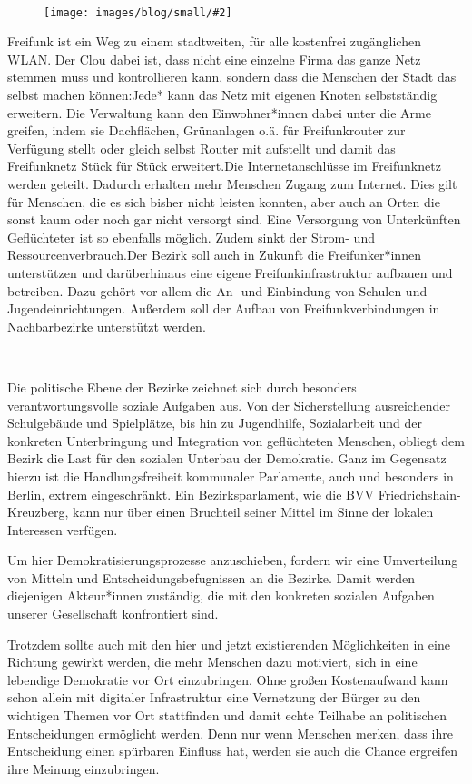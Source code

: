 \documentclass[a4paper,10pt]{article}
\newcommand{\mysection}[1]{{\vspace{1cm}\noindent\color{gray}{\ttfamily\LARGE\raggedright #1}\\\medskip}}
\newcommand{\abschnitt}[2]{%
\mysection{\raggedright #1}%
\begin{figure}[t]%
\vspace*{-2.7cm}%
\hspace*{-2.1cm}%
\texttt{[image: images/blog/small/\#2]} %
\end{figure}%
}
\begin{document}
\clearpage
\abschnitt{Freifunk}{routerallerlaender.jpg}

\enlargethispage{-1em}
Freifunk ist ein Weg zu einem stadtweiten, für alle kostenfrei
zugänglichen WLAN. Der Clou dabei ist, dass nicht eine einzelne Firma
das ganze Netz stemmen muss und kontrollieren kann, sondern dass die
Menschen der Stadt das selbst machen können:Jede* kann das Netz mit
eigenen Knoten selbstständig erweitern. Die Verwaltung kann den
Einwohner*innen dabei unter die Arme greifen, indem sie
Dachflächen, Grünanlagen o.ä. für Freifunkrouter zur Verfügung stellt
oder gleich selbst Router mit aufstellt und damit das Freifunknetz Stück
für Stück erweitert.Die Internetanschlüsse im Freifunknetz werden
geteilt. Dadurch erhalten mehr Menschen Zugang zum Internet. Dies gilt
für Menschen, die es sich bisher nicht leisten konnten, aber auch an
Orten die sonst kaum oder noch gar nicht versorgt sind. Eine Versorgung
von Unterkünften Geflüchteter ist so ebenfalls möglich. Zudem sinkt der
Strom- und Ressourcenverbrauch.Der Bezirk soll auch in Zukunft die
Freifunker*innen unterstützen und darüberhinaus eine eigene
Freifunkinfrastruktur aufbauen und betreiben. Dazu gehört vor allem die
An- und Einbindung von Schulen und Jugendeinrichtungen. Außerdem soll
der Aufbau von Freifunkverbindungen in Nachbarbezirke unterstützt
werden.


\mysection{Soziales}

Die politische Ebene der Bezirke zeichnet sich durch besonders
verantwortungsvolle soziale Aufgaben aus. Von der Sicherstellung
ausreichender Schulgebäude und Spielplätze, bis hin zu Jugendhilfe,
Sozialarbeit und der konkreten Unterbringung und Integration von
geflüchteten Menschen, obliegt dem Bezirk die Last für den sozialen
Unterbau der Demokratie. Ganz im Gegensatz hierzu ist die
Handlungsfreiheit kommunaler Parlamente, auch und besonders in Berlin,
extrem eingeschränkt. Ein Bezirksparlament, wie die BVV
Friedrichshain-Kreuzberg, kann nur über einen Bruchteil seiner Mittel im
Sinne der lokalen Interessen verfügen.

Um hier Demokratisierungsprozesse anzuschieben, fordern wir eine
Umverteilung von Mitteln und Entscheidungsbefugnissen an die Bezirke.
Damit werden diejenigen Akteur*innen zuständig, die mit den konkreten
sozialen Aufgaben unserer Gesellschaft konfrontiert sind.

Trotzdem sollte auch mit den hier und jetzt existierenden Möglichkeiten
in eine Richtung gewirkt werden, die mehr Menschen dazu motiviert, sich
in eine lebendige Demokratie vor Ort einzubringen. Ohne großen
Kostenaufwand kann schon allein mit digitaler Infrastruktur eine
Vernetzung der Bürger zu den wichtigen Themen vor Ort stattfinden und
damit echte Teilhabe an politischen Entscheidungen ermöglicht werden.
Denn nur wenn Menschen merken, dass ihre Entscheidung einen spürbaren
Einfluss hat, werden sie auch die Chance ergreifen ihre Meinung
einzubringen.
\end{document}
